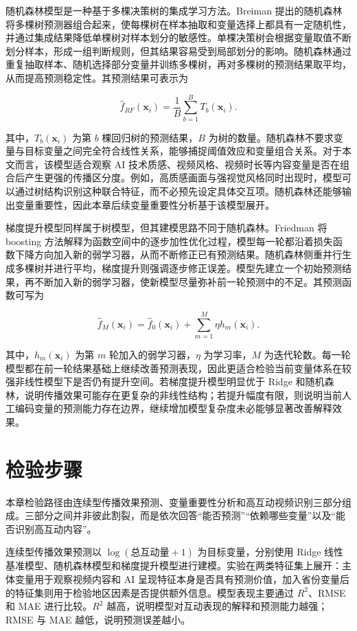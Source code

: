 随机森林模型是一种基于多棵决策树的集成学习方法。Breiman 提出的随机森林将多棵树预测器组合起来，使每棵树在样本抽取和变量选择上都具有一定随机性，并通过集成结果降低单棵树对样本划分的敏感性\cite{breiman2001random}。单棵决策树会根据变量取值不断划分样本，形成一组判断规则，但其结果容易受到局部划分的影响。随机森林通过重复抽取样本、随机选择部分变量并训练多棵树，再对多棵树的预测结果取平均，从而提高预测稳定性。其预测结果可表示为
\begin{compactformula}
\[
\hat{f}_{RF}(\mathbf{x}_i)=\frac{1}{B}\sum_{b=1}^{B}T_b(\mathbf{x}_i).
\]
\end{compactformula}
其中，$T_b(\mathbf{x}_i)$ 为第 $b$ 棵回归树的预测结果，$B$ 为树的数量。随机森林不要求变量与目标变量之间完全符合线性关系，能够捕捉阈值效应和变量组合关系。对于本文而言，该模型适合观察 AI 技术质感、视频风格、视频时长等内容变量是否在组合后产生更强的传播区分度。例如，高质感画面与强视觉风格同时出现时，模型可以通过树结构识别这种联合特征，而不必预先设定具体交互项。随机森林还能够输出变量重要性，因此本章后续变量重要性分析基于该模型展开。

梯度提升模型同样属于树模型，但其建模思路不同于随机森林。Friedman 将 boosting 方法解释为函数空间中的逐步加性优化过程，模型每一轮都沿着损失函数下降方向加入新的弱学习器，从而不断修正已有预测结果\cite{friedman2001greedy}。随机森林侧重并行生成多棵树并进行平均，梯度提升则强调逐步修正误差。模型先建立一个初始预测结果，再不断加入新的弱学习器，使新模型尽量弥补前一轮预测中的不足。其预测函数可写为
\begin{compactformula}
\[
\hat{f}_{M}(\mathbf{x}_i)=\hat{f}_{0}(\mathbf{x}_i)+\sum_{m=1}^{M}\eta h_m(\mathbf{x}_i).
\]
\end{compactformula}
其中，$h_m(\mathbf{x}_i)$ 为第 $m$ 轮加入的弱学习器，$\eta$ 为学习率，$M$ 为迭代轮数。每一轮模型都在前一轮结果基础上继续改善预测表现，因此更适合检验当前变量体系在较强非线性模型下是否仍有提升空间。若梯度提升模型明显优于 Ridge 和随机森林，说明传播效果可能存在更复杂的非线性结构；若提升幅度有限，则说明当前人工编码变量的预测能力存在边界，继续增加模型复杂度未必能够显著改善解释效果。

\section{检验步骤}

本章检验路径由连续型传播效果预测、变量重要性分析和高互动视频识别三部分组成。三部分之间并非彼此割裂，而是依次回答“能否预测”“依赖哪些变量”以及“能否识别高互动内容”。

连续型传播效果预测以 $\log(\text{总互动量}+1)$ 为目标变量，分别使用 Ridge 线性基准模型、随机森林模型和梯度提升模型进行建模。实验在两类特征集上展开：主体变量用于观察视频内容和 AI 呈现特征本身是否具有预测价值，加入省份变量后的特征集则用于检验地区因素是否提供额外信息。模型表现主要通过 $R^2$、RMSE 和 MAE 进行比较。$R^2$ 越高，说明模型对互动表现的解释和预测能力越强；RMSE 与 MAE 越低，说明预测误差越小。


